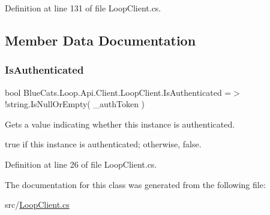 Definition at line 131 of file Loop\+Client.\+cs.



\subsection{Member Data Documentation}
\mbox{\label{class_blue_cats_1_1_loop_1_1_api_1_1_client_1_1_loop_client_a412425e79f996f5bc9c16a17b86e5926}} 
\subsubsection{\texorpdfstring{Is\+Authenticated}{IsAuthenticated}}
{\footnotesize\ttfamily bool Blue\+Cats.\+Loop.\+Api.\+Client.\+Loop\+Client.\+Is\+Authenticated =$>$ !string.\+Is\+Null\+Or\+Empty( \+\_\+auth\+Token )}



Gets a value indicating whether this instance is authenticated. 

{\ttfamily true} if this instance is authenticated; otherwise, {\ttfamily false}. 

Definition at line 26 of file Loop\+Client.\+cs.



The documentation for this class was generated from the following file\+:\begin{DoxyCompactItemize}
\item 
src/\mbox{\hyperlink{_loop_client_8cs}{Loop\+Client.\+cs}}\end{DoxyCompactItemize}
